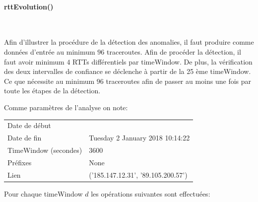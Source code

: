 \paragraph{rttEvolution()}~

Afin d'illustrer la procédure de la détection des anomalies, il faut produire comme données d'entrée au minimum $96$ traceroutes. Afin de procéder la détection, il faut avoir minimum $4$ RTTs différentiels par timeWindow. De plus, la vérification des deux intervalles de confiance se déclenche à partir de la 25 ème timeWindow. Ce que nécessite au minimum $96$ traceroutes afin de passer au moins une fois par toute les étapes de la détection. 

 Comme paramètres de l'analyse on note:
 
 \begin{table}
\begin{tabular}{ll}
	 Date de début &\\
	 Date de fin & Tuesday 2 January 2018 10:14:22\\
	 TimeWindow (secondes) & 3600 \\ 
	 Préfixes & None \\
	 Lien & ('185.147.12.31', '89.105.200.57')\\
 \end{tabular}
 \end{table}
 
 Pour chaque timeWindow $d$ les opérations suivantes sont effectuées:
 
